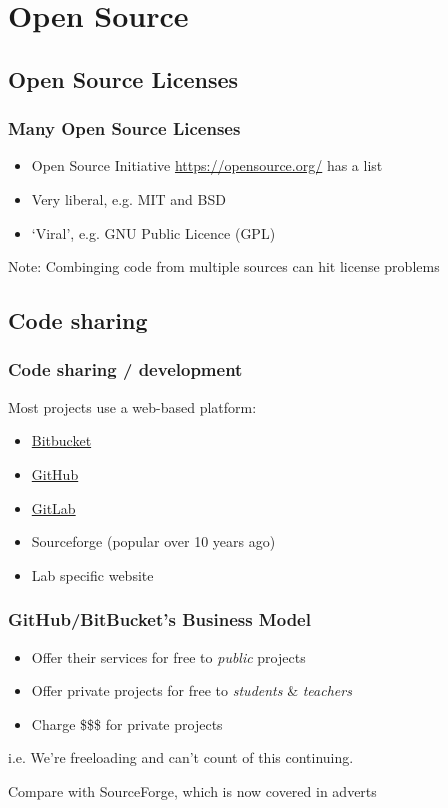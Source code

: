 \section{Open Source}

\subsection{Open Source Licenses}

\begin{frame}
  \frametitle{Many Open Source Licenses}
  \begin{itemize}
    \item Open Source Initiative \url{https://opensource.org/} has a list
    \item Very liberal, e.g. MIT and BSD
    \item `Viral', e.g. GNU Public Licence (GPL)
  \end{itemize}
  Note: Combinging code from multiple  sources can hit license problems
\end{frame}

\subsection{Code sharing}

\begin{frame}
  \frametitle{Code sharing / development}
  Most projects use a web-based platform:
  \begin{itemize}
    \item \href{https://bitbucket.org/product}{Bitbucket}
    \item \href{https://github.com/}{GitHub}
    \item \href{https://about.gitlab.com/}{GitLab}
    \item Sourceforge (popular over 10 years ago)
    \item Lab specific website
  \end{itemize}
\end{frame}

\begin{frame}
  \frametitle{GitHub/BitBucket's Business Model}
  \begin{itemize}
    \item Offer their services for free to \emph{public} projects
    \item Offer private projects for free to \emph{students} \& \emph{teachers}
    \item Charge \$\$\$ for private projects
  \end{itemize}
  i.e. We're freeloading and can't count of this continuing.

  Compare with SourceForge, which is now covered in adverts
\end{frame}

